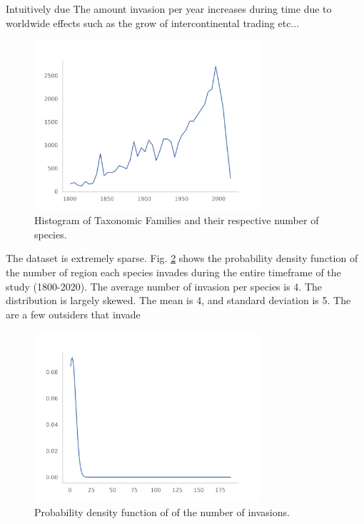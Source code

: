 \documentclass[mscthesis]{usiinfthesis}
\begin{document}
Intuitively due The amount invasion per year increases during time due to worldwide effects such as the grow of intercontinental trading etc...
\begin{figure}[H]
    \centering
    \includegraphics[width=0.75\textwidth]{invasion_per_year.png}
    \caption{Histogram of Taxonomic Families and their respective number of species.}
    \label{fig:pdf_invasion}
\end{figure}


The dataset is extremely sparse. Fig. \ref{fig:pdf_invasion} shows the probability density function of the number of region each species invades during the entire timeframe of the study (1800-2020).  The average number of invasion per species is 4. The distribution is largely skewed. The mean is 4, and standard deviation is 5. The are a few outsiders that invade

\begin{figure}[H]
    \centering
    \includegraphics[width=0.75\textwidth]{species_region_invasion.png}
    \caption{Probability density function of of the number of invasions.}
    \label{fig:pdf_invasion}
\end{figure}
\end{document}
